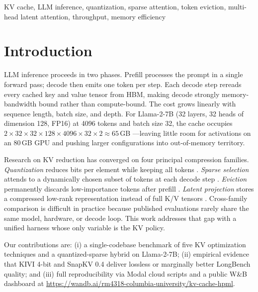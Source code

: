 \documentclass[conference]{IEEEtran}
\begin{document}
\begin{IEEEkeywords}
KV cache, LLM inference, quantization, sparse attention, token eviction,
multi-head latent attention, throughput, memory efficiency
\end{IEEEkeywords}

\section{Introduction}

LLM inference proceeds in two phases.  Prefill processes the prompt in
a single forward pass; decode then emits one token per step.  Each
decode step rereads every cached key and value tensor from HBM, making
decode strongly memory-bandwidth bound rather than compute-bound.  The
cost grows linearly with sequence length, batch size, and depth.  For
Llama-2-7B \cite{llama2} (32 layers, 32 heads of dimension 128, FP16) at
4096 tokens and batch size 32, the cache occupies
$2\times32\times32\times128\times4096\times32\times2 \approx 65$\,GB
\cite{survey}---leaving little room for activations on an 80\,GB GPU
and pushing larger configurations into out-of-memory territory.

Research on KV reduction has converged on four principal compression
families.  \emph{Quantization} reduces bits per element while keeping
all tokens \cite{kivi,kvquant}.  \emph{Sparse selection} attends to a
dynamically chosen subset of tokens at each decode step
\cite{tokenselect,rocketkv}.  \emph{Eviction} permanently discards
low-importance tokens after prefill \cite{h2o,snapkv,adakv}.
\emph{Latent projection} stores a compressed low-rank representation
instead of full K/V tensors \cite{deepseekv2,transmla}.  Cross-family
comparison is difficult in practice because published evaluations
rarely share the same model, hardware, or decode loop.  This work
addresses that gap with a unified harness whose only variable is the KV
policy.

Our contributions are: (i) a single-codebase benchmark of five KV
optimization techniques and a quantized-sparse hybrid on Llama-2-7B;
 (ii) empirical evidence that KIVI 4-bit and SnapKV 0.4
deliver lossless or marginally better LongBench quality; and (iii) full
reproducibility via Modal cloud scripts and a public W\&B dashboard at
\url{https://wandb.ai/rm4318-columbia-university/kv-cache-hpml}.

\end{document}
